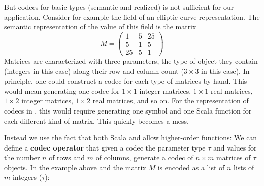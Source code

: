 But codecs for basic types (semantic and realized) is not sufficient for our application.
Consider for example the  field of an elliptic curve
representation.  The semantic representation of the value of this field is the matrix
\[M = \left(
    \begin{array}{ccc}
      1 & 5 & 25 \\
      5 & 1 & 5 \\
      25 & 5 & 1 \end{array} 
  \right)
\]
Matrices are characterized with three parameters, the type of object they contain
(integers in this case) along their row and column count ($3 \times 3$ in this case).  In
principle, one could construct a codec for each type of matrices by hand.  This would mean
generating one codec for $1 \times 1$ integer matrices, $1 \times 1$ real matrices,
$1 \times 2$ integer matrices, $1 \times 2$ real matrices, and so on.  For the
representation of codecs in \mmt, this would require generating one symbol and one Scala
function for each different kind of matrix.  This quickly becomes a mess.

Instead we use the fact that both Scala and \ommt allow higher-order functions: We can
define a \textbf{codec operator} that given a codec the parameter type $\tau$ and values
for the number $n$ of rows and $m$ of columns, generate a codec of $n\times m$ matrices of
$\tau$ objects. In the example above and the matrix $M$ is encoded as a list of $n$ lists
of $m$ integers ($\tau$):
\inlinecode{[[1.0,5.0,25.0],[5.0,1.0,5.0],[25.0,5.0,1.0]]}

